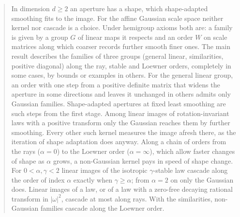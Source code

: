 \documentclass[11pt]{article}
\numberwithin{equation}{section}
\theoremstyle{plain}
\theoremstyle{definition}
\theoremstyle{remark}
\begin{document}
\begin{abstract}
In dimension $d \ge 2$ an aperture has a shape, which shape-adapted smoothing fits to the
image. For the affine Gaussian scale space neither kernel nor cascade is a
choice. Under hemigroup axioms both are: a family is given by a group $G$ of linear maps it
respects and an order $W$ on scale matrices along which coarser records further smooth finer
ones. The main result describes the families of three groups (general linear, similarities,
positive diagonal) along the ray, stable and Loewner orders, completely in some cases, by bounds or
examples in others. For the general linear group, an order with one step from a positive definite
matrix that widens the aperture in some directions and leaves it unchanged in others admits
only Gaussian families. Shape-adapted apertures at fixed least smoothing are such steps from the first stage. Among
linear images of rotation-invariant laws with a positive transform only the Gaussian reaches them
by further smoothing. Every other such kernel measures the image afresh there, as the iteration of
shape adaptation does anyway. Along a chain of orders from the rays ($\alpha = 0$) to the Loewner order
($\alpha = \infty$), which allow faster changes of shape as $\alpha$ grows, a non-Gaussian kernel
pays in speed of shape change. For
$0 < \alpha, \gamma < 2$ linear images of the isotropic $\gamma$-stable law cascade along the order
of index $\alpha$ exactly when $\gamma \ge \alpha$; from $\alpha = 2$ on only the Gaussian does.
Linear images of a \Matern{} law, or of a law with a zero-free decaying rational transform in
$|\omega|^2$, cascade at most along rays. With the similarities, non-Gaussian
families cascade along the Loewner order.

\end{abstract}
\end{document}

